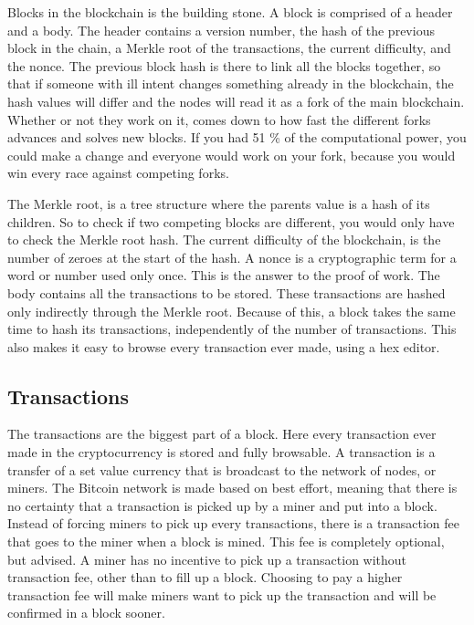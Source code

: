 \documentclass[11pt]{article}
\begin{document}
Blocks in the blockchain is the building stone. A block is comprised of a header and a body. The header contains a version number, the hash of the previous block in the chain, a Merkle root of the transactions, the current difficulty, and the nonce. The previous block hash is there to link all the blocks together, so that if someone with ill intent changes something already in the blockchain, the hash values will differ and the nodes will read it as a fork of the main blockchain. Whether or not they work on it, comes down to how fast the different forks advances and solves new blocks. If you had 51 \% of the computational power, you could make a change and everyone would work on your fork, because you would win every race against competing forks.

 The Merkle root\cite{merkle}, is a tree structure where the parents value is a hash of its children. So to check if two competing blocks are different, you would only have to check the Merkle root hash. The current difficulty of the blockchain, is the number of zeroes at the start of the hash. A nonce is a cryptographic term for a word or number used only once. This is the answer to the proof of work. The body contains all the transactions to be stored. These transactions are hashed only indirectly through the Merkle root. Because of this, a block takes the same time to hash its transactions, independently of the number of transactions. This also makes it easy to browse every transaction ever made, using a hex editor.
\subsection{Transactions}

The transactions are the biggest part of a block. Here every transaction ever made in the cryptocurrency is stored and fully browsable. A transaction is a transfer of a set value currency that is broadcast to the network of nodes, or miners. The Bitcoin network is made based on best effort, meaning that there is no certainty that a transaction is picked up by a miner and put into a block. Instead of forcing miners to pick up every transactions, there is a transaction fee that goes to the miner when a block is mined. This fee is completely optional, but advised. A miner has no incentive to pick up a transaction without transaction fee, other than to fill up a block. Choosing to pay a higher transaction fee will make miners want to pick up the transaction and will be confirmed in a block sooner. 
\end{document}

